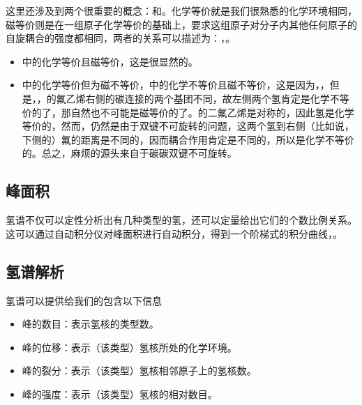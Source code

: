 这里还涉及到两个很重要的概念：和。化学等价就是我们很熟悉的化学环境相同，磁等价则是在一组原子化学等价的基础上，要求这组原子对分子内其他任何原子的自旋耦合的强度都相同，两者的关系可以描述为：，。
\begin{itemize}
    \item {}中的化学等价且磁等价，这是很显然的。
    \item {}中的化学等价但为磁不等价，中的化学不等价且磁不等价，这是因为，，但是，，的氟乙烯右侧的碳连接的两个基团不同，故左侧两个氢肯定是化学不等价的了，那自然也不可能是磁等价的了。的二氟乙烯是对称的，因此氢是化学等价的，然而，仍然是由于双键不可旋转的问题，这两个氢到右侧（比如说，下侧的）氟的距离是不同的，因而耦合作用肯定是不同的，所以是化学不等价的。总之，麻烦的源头来自于碳碳双键不可旋转。
\end{itemize}

\subsection{峰面积}
氢谱不仅可以定性分析出有几种类型的氢，还可以定量给出它们的个数比例关系。这可以通过自动积分仪对峰面积进行自动积分，得到一个阶梯式的积分曲线，。

\subsection{氢谱解析}
氢谱可以提供给我们的包含以下信息
\begin{itemize}
    \item 峰的数目：表示氢核的类型数。
    \item 峰的位移：表示（该类型）氢核所处的化学环境。
    \item 峰的裂分：表示（该类型）氢核相邻原子上的氢核数。
    \item 峰的强度：表示（该类型）氢核的相对数目。
\end{itemize}